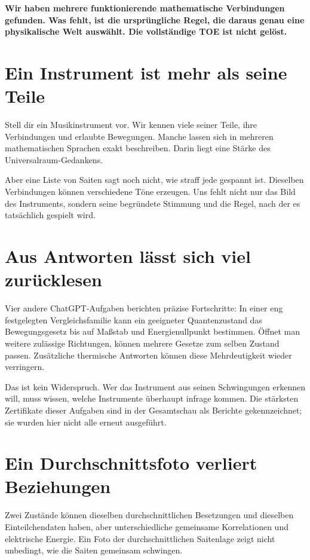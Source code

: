 
\maketitle
\textbf{Wir haben mehrere funktionierende mathematische Verbindungen
gefunden. Was fehlt, ist die ursprüngliche Regel, die daraus genau eine
physikalische Welt auswählt. Die vollständige TOE ist nicht gelöst.}

\section*{Ein Instrument ist mehr als seine Teile}
Stell dir ein Musikinstrument vor. Wir kennen viele seiner Teile, ihre
Verbindungen und erlaubte Bewegungen. Manche lassen sich in mehreren
mathematischen Sprachen exakt beschreiben. Darin liegt eine Stärke des
Universalraum-Gedankens.

Aber eine Liste von Saiten sagt noch nicht, wie straff jede gespannt ist.
Dieselben Verbindungen können verschiedene Töne erzeugen. Uns fehlt nicht
nur das Bild des Instruments, sondern seine begründete Stimmung und die
Regel, nach der es tatsächlich gespielt wird.

\section*{Aus Antworten lässt sich viel zurücklesen}
Vier andere ChatGPT-Aufgaben berichten präzise Fortschritte: In einer eng
festgelegten Vergleichsfamilie kann ein geeigneter Quantenzustand das
Bewegungsgesetz bis auf Maßstab und Energienullpunkt bestimmen. Öffnet man
weitere zulässige Richtungen, können mehrere Gesetze zum selben Zustand
passen. Zusätzliche thermische Antworten können diese Mehrdeutigkeit wieder
verringern.

Das ist kein Widerspruch. Wer das Instrument aus seinen Schwingungen
erkennen will, muss wissen, welche Instrumente überhaupt infrage kommen.
Die stärksten Zertifikate dieser Aufgaben sind in der Gesamtschau als
Berichte gekennzeichnet; sie wurden hier nicht alle erneut ausgeführt.

\section*{Ein Durchschnittsfoto verliert Beziehungen}
Zwei Zustände können dieselben durchschnittlichen Besetzungen und dieselben
Einteilchendaten haben, aber unterschiedliche gemeinsame Korrelationen und
elektrische Energie. Ein Foto der durchschnittlichen Saitenlage zeigt nicht
unbedingt, wie die Saiten gemeinsam schwingen.

